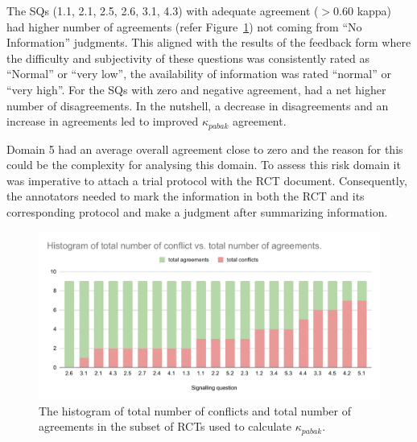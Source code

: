 \documentclass[sn-mathphys,Numbered]{sn-jnl}%
\theoremstyle{thmstyleone}%
\theoremstyle{thmstyletwo}%
\theoremstyle{thmstylethree}%
\begin{document}
The SQs (1.1, 2.1, 2.5, 2.6, 3.1, 4.3) with adequate agreement ($>0.60$ kappa) had higher number of agreements (refer Figure~\ref{fig:pabakagreement}) not coming from ``No Information'' judgments.
This aligned with the results of the feedback form where the difficulty and subjectivity of these questions was consistently rated as ``Normal'' or ``very low'', the availability of information was rated ``normal'' or ``very high''.
For the SQs with zero and negative agreement, had a net higher number of disagreements.
In the nutshell, a decrease in disagreements and an increase in agreements led to improved $\kappa_{pabak}$ agreement.


Domain 5 had an average overall agreement close to zero and the reason for this could be the complexity for analysing this domain.
To assess this risk domain it was imperative to attach a trial protocol with the RCT document.
Consequently, the annotators needed to mark the information in both the RCT and its corresponding protocol and make a judgment after summarizing information.


%
%
%
\begin{figure}
    \centering
    \includegraphics[width=0.99\columnwidth]{figures/agreements.pdf}
    \caption{The histogram of total number of conflicts and total number of agreements in the subset of RCTs used to calculate $\kappa_{pabak}$.}
    \label{fig:pabakagreement}
\end{figure}
%
%
%

%
%
%
\end{document}
